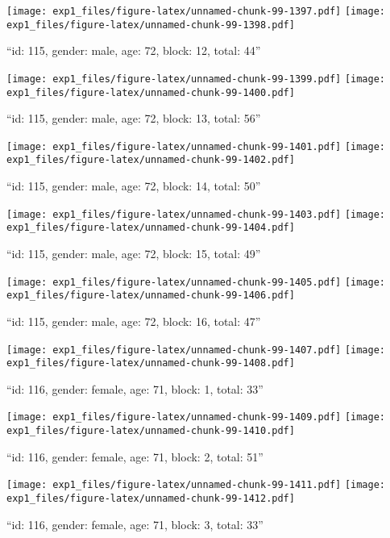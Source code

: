 \documentclass[,]{article}
\begin{document}
\texttt{[image: exp1\_files/figure-latex/unnamed-chunk-99-1397.pdf]}
\texttt{[image: exp1\_files/figure-latex/unnamed-chunk-99-1398.pdf]}

\newpage
[1] 

``id: 115, gender: male, age: 72, block: 12, total: 44''

\texttt{[image: exp1\_files/figure-latex/unnamed-chunk-99-1399.pdf]}
\texttt{[image: exp1\_files/figure-latex/unnamed-chunk-99-1400.pdf]}

\newpage
[1] 

``id: 115, gender: male, age: 72, block: 13, total: 56''

\texttt{[image: exp1\_files/figure-latex/unnamed-chunk-99-1401.pdf]}
\texttt{[image: exp1\_files/figure-latex/unnamed-chunk-99-1402.pdf]}

\newpage
[1] 

``id: 115, gender: male, age: 72, block: 14, total: 50''

\texttt{[image: exp1\_files/figure-latex/unnamed-chunk-99-1403.pdf]}
\texttt{[image: exp1\_files/figure-latex/unnamed-chunk-99-1404.pdf]}

\newpage
[1] 

``id: 115, gender: male, age: 72, block: 15, total: 49''

\texttt{[image: exp1\_files/figure-latex/unnamed-chunk-99-1405.pdf]}
\texttt{[image: exp1\_files/figure-latex/unnamed-chunk-99-1406.pdf]}

\newpage
[1] 

``id: 115, gender: male, age: 72, block: 16, total: 47''

\texttt{[image: exp1\_files/figure-latex/unnamed-chunk-99-1407.pdf]}
\texttt{[image: exp1\_files/figure-latex/unnamed-chunk-99-1408.pdf]}

\newpage
[1] 

``id: 116, gender: female, age: 71, block: 1, total: 33''

\texttt{[image: exp1\_files/figure-latex/unnamed-chunk-99-1409.pdf]}
\texttt{[image: exp1\_files/figure-latex/unnamed-chunk-99-1410.pdf]}

\newpage
[1] 

``id: 116, gender: female, age: 71, block: 2, total: 51''

\texttt{[image: exp1\_files/figure-latex/unnamed-chunk-99-1411.pdf]}
\texttt{[image: exp1\_files/figure-latex/unnamed-chunk-99-1412.pdf]}

\newpage
[1] 

``id: 116, gender: female, age: 71, block: 3, total: 33''
\end{document}
